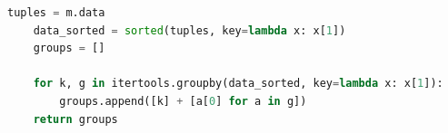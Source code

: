\begin{lstlisting}[language=Python, caption={Clustering Data}, label={lst:python-clustering}] 
    tuples = m.data
    data_sorted = sorted(tuples, key=lambda x: x[1])
    groups = []

    for k, g in itertools.groupby(data_sorted, key=lambda x: x[1]):
        groups.append([k] + [a[0] for a in g])
    return groups
\end{lstlisting}